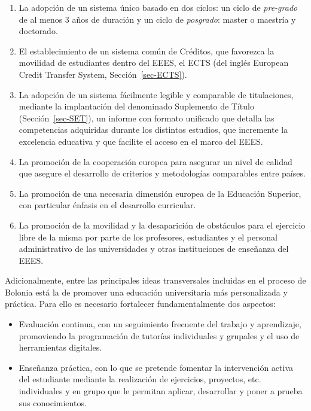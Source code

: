 \documentclass[
  11pt,
  a4paper,
  twoside]{scrreprt}
\providecommand{\tightlist}{%
  \setlength{\itemsep}{0pt}\setlength{\parskip}{0pt}}
\begin{document}
\begin{enumerate}
\def\labelenumi{\arabic{enumi}.}
\tightlist
\item
  La adopción de un sistema único basado en dos ciclos: un ciclo de
  \emph{pre-grado} de al menos 3 años de duración y un ciclo de
  \emph{posgrado}: master o maestría y doctorado.
\item
  El establecimiento de un sistema común de Créditos, que favorezca la
  movilidad de estudiantes dentro del EEES, el ECTS (del inglés European
  Credit Transfer System, Sección~\ref{sec-ECTS}).
\item
  La adopción de un sistema fácilmente legible y comparable de
  titulaciones, mediante la implantación del denominado Suplemento de
  Título (Sección~\ref{sec-SET}), un informe con formato unificado que
  detalla las competencias adquiridas durante los distintos estudios,
  que incremente la excelencia educativa y que facilite el acceso en el
  marco del EEES.
\item
  La promoción de la cooperación europea para asegurar un nivel de
  calidad que asegure el desarrollo de criterios y metodologías
  comparables entre países.
\item
  La promoción de una necesaria dimensión europea de la Educación
  Superior, con particular énfasis en el desarrollo curricular.
\item
  La promoción de la movilidad y la desaparición de obstáculos para el
  ejercicio libre de la misma por parte de los profesores, estudiantes y
  el personal administrativo de las universidades y otras instituciones
  de enseñanza del EEES.
\end{enumerate}

Adicionalmente, entre las principales ideas transversales incluidas en
el proceso de Bolonia está la de promover una educación universitaria
más personalizada y práctica. Para ello es necesario fortalecer
fundamentalmente dos aspectos:

\begin{itemize}
\item
  Evaluación continua, con un seguimiento frecuente del trabajo y
  aprendizaje, promoviendo la programación de tutorías individuales y
  grupales y el uso de herramientas digitales.
\item
  Enseñanza práctica, con lo que se pretende fomentar la intervención
  activa del estudiante mediante la realización de ejercicios,
  proyectos, etc. individuales y en grupo que le permitan aplicar,
  desarrollar y poner a prueba sus conocimientos.
\end{itemize}
\end{document}
